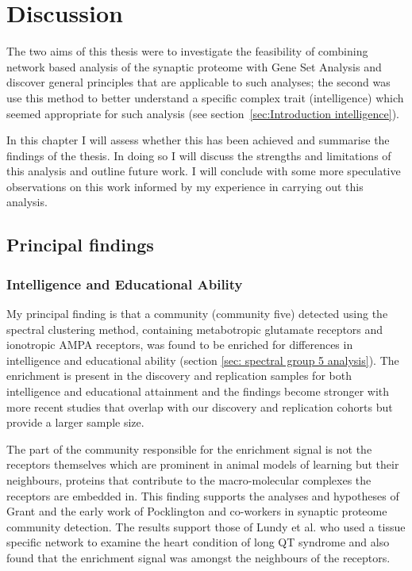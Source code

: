 \chapter{Discussion}

The two  aims of this thesis were to investigate the feasibility of combining network based analysis of the synaptic proteome with Gene Set Analysis and discover general  principles that are applicable to such analyses; the second was use this method to better understand a specific complex trait (intelligence) which seemed appropriate for such analysis (see section~\ref{sec:Introduction intelligence}).

In this chapter I will assess whether this has been achieved and summarise the findings of the thesis. In doing so I will discuss the strengths and limitations of this analysis and outline future work. I will conclude with some more speculative observations on this work informed by my experience in carrying out this analysis.

\section{Principal findings}
\subsection{Intelligence and Educational Ability}
My principal finding is that a community (community five) detected using the spectral clustering method, containing metabotropic glutamate receptors and ionotropic AMPA receptors, was found to be enriched for differences in intelligence and educational ability (section \ref{sec: spectral group 5 analysis}). The enrichment is present in the discovery and replication samples for both intelligence and educational attainment and the findings become stronger with more recent studies that overlap with our discovery and replication cohorts but provide a larger sample size. 

The part of the community responsible for the enrichment signal is not the receptors themselves which are prominent in animal models of learning but their neighbours, proteins that contribute to the macro-molecular complexes the receptors are embedded in. This finding supports the analyses and hypotheses of Grant \cite{grant2012synaptopathies} and the early work of Pocklington and co-workers \cite{pocklington2006proteomes} in synaptic proteome community detection. The results support those of Lundy et al.\cite{lundby2014annotation} who used a tissue specific network to examine the heart condition of long QT syndrome and also found that the enrichment signal was amongst the neighbours of the receptors. 

